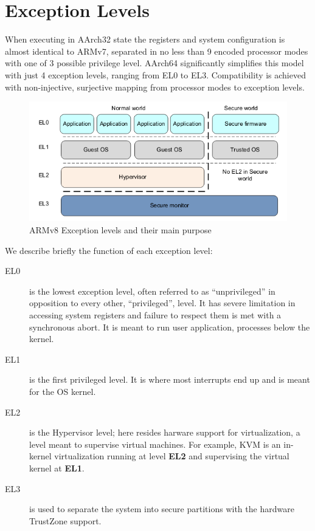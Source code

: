 \documentclass[12pt,a4paper,openright,twoside]{report}
\begin{document}
\section{Exception Levels}
When executing in AArch32 state the registers and system configuration is almost
identical to ARMv7, separated in no less than 9 encoded processor modes with one
of 3 possible privilege level. AArch64 significantly simplifies this model with
just 4 exception levels, ranging from EL0 to EL3. Compatibility is achieved with 
non-injective, surjective mapping from processor modes to exception levels.

\begin{figure}[t]
    \begin{center}
\includegraphics[scale=0.6]{tesi7.png}
\caption[ARMv8 Exception Levels]{ARMv8 Exception levels and their main purpose}\label{fig:armv8el}
    \end{center}
\end{figure}

We describe briefly the function of each exception level:
\begin{description}
    \item[EL0] is the lowest exception level, often referred to as ``unprivileged''
        in opposition to every other, ``privileged'', level. It has severe 
        limitation in accessing system registers and failure to respect them
        is met with a synchronous abort. It is meant to run user application, 
        processes below the kernel.
    \item[EL1] is the first privileged level. It is where most interrupts end
        up and is meant for the OS kernel.
    \item[EL2] is the Hypervisor level; here resides harware support for virtualization,
        a level meant to supervise virtual machines. For example, KVM is an in-kernel
        virtualization running at level \textbf{EL2} and supervising the virtual kernel 
        at \textbf{EL1}.
    \item[EL3] is used to separate the system into secure partitions with the
        hardware TrustZone support.
\end{description}
\end{document}
